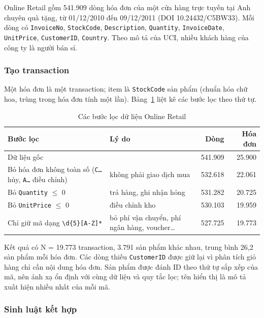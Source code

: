 Online Retail \cite{retail} gồm 541.909 dòng hóa đơn của một cửa hàng trực tuyến tại Anh chuyên quà tặng, từ 01/12/2010 đến 09/12/2011 (DOI 10.24432/C5BW33). Mỗi dòng có \texttt{InvoiceNo}, \texttt{StockCode}, \texttt{Description}, \texttt{Quantity}, \texttt{InvoiceDate}, \texttt{UnitPrice}, \texttt{CustomerID}, \texttt{Country}. Theo mô tả của UCI, nhiều khách hàng của công ty là người bán sỉ.

\subsubsection{Tạo transaction}

Một hóa đơn là một transaction; item là \texttt{StockCode} sản phẩm (chuẩn hóa chữ hoa, trùng trong hóa đơn tính một lần). Bảng~\ref{tab:c3-I} liệt kê các bước lọc theo thứ tự.

\begin{table}[!t]
\centering\footnotesize
\caption{Các bước lọc dữ liệu Online Retail}
\label{tab:c3-I}
\setlength{\tabcolsep}{4pt}
\begin{tabular}{llrr}
\hline
\textbf{Bước lọc} & \textbf{Lý do} & \textbf{Dòng} & \textbf{Hóa đơn} \\ \hline
Dữ liệu gốc &  & 541.909 & 25.900 \\
Bỏ hóa đơn không toàn số (\texttt{C…} hủy, \texttt{A…} điều chỉnh) & không phải giao dịch mua & 532.618 & 22.061 \\
Bỏ \texttt{Quantity} $\le$ 0 & trả hàng, ghi nhận hỏng & 531.282 & 20.725 \\
Bỏ \texttt{UnitPrice} $\le$ 0 & điều chỉnh kho & 530.103 & 19.959 \\
Chỉ giữ mã dạng \texttt{\textbackslash{}d\{5\}{[}A-Z{]}*} & bỏ phí vận chuyển, phí ngân hàng, voucher\ldots{} & 527.725 & 19.773 \\
\hline
\end{tabular}
\end{table}

Kết quả có N = 19.773 transaction, 3.791 sản phẩm khác nhau, trung bình 26,2 sản phẩm mỗi hóa đơn. Các dòng thiếu \texttt{CustomerID} được giữ lại vì phân tích giỏ hàng chỉ cần nội dung hóa đơn. Sản phẩm được đánh ID theo thứ tự sắp xếp của mã, nên ánh xạ ổn định với cùng dữ liệu và quy tắc lọc; tên hiển thị là mô tả xuất hiện nhiều nhất của mỗi mã.

\subsubsection{Sinh luật kết hợp}

